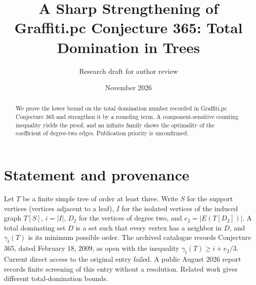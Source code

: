 \documentclass[11pt]{article}
\title{A Sharp Strengthening of Graffiti.pc Conjecture 365: Total Domination in Trees}
\author{Research draft for author review}
\date{November 2026}
\begin{document}
\maketitle
\begin{abstract}
We prove the lower bound on the total domination number recorded in Graffiti.pc Conjecture 365 and strengthen it by a rounding term. A component-sensitive counting inequality yields the proof, and an infinite family shows the optimality of the coefficient of degree-two edges. Publication priority is unconfirmed.
\end{abstract}
\section{Statement and provenance}
Let $T$ be a finite simple tree of order at least three. Write $S$ for the support vertices (vertices adjacent to a leaf), $I$ for the isolated vertices of the induced graph $T[S]$, $i=|I|$, $D_2$ for the vertices of degree two, and $e_2=|E(T[D_2])|$. A total dominating set $D$ is a set such that every vertex has a neighbor in $D$, and $\gamma_t(T)$ is its minimum possible order. The archived catalogue \cite{archive} records Conjecture 365, dated February 18, 2009, as open with the inequality $\gamma_t(T)\ge i+e_2/3$. Current direct access to the original entry \cite{wow} failed. A public August 2026 report \cite{screen} records finite screening of this entry without a resolution. Related work \cite{related1,related2} gives different total-domination bounds.
\end{document}
